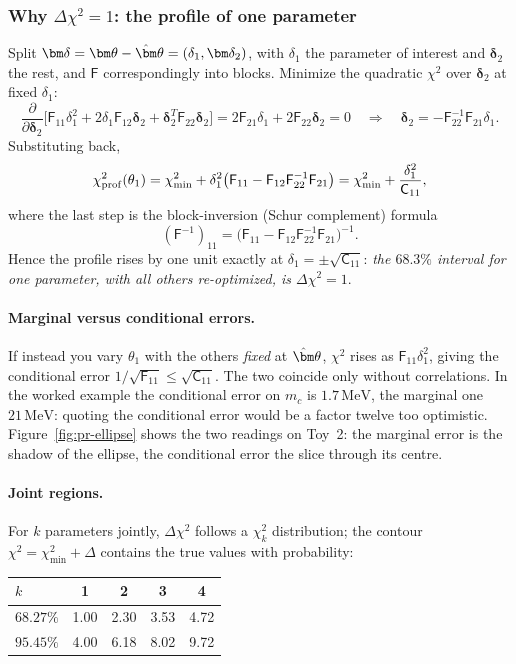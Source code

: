 \documentclass[11pt,a4paper]{article}
\numberwithin{equation}{section}
\theoremstyle{definition}
\theoremstyle{plain}
\theoremstyle{remark}
\numberwithin{algorithm}{section}
\newcommand{\MeV}{\,\mathrm{MeV}}
\newcommand{\sF}{\mathsf F}
\newcommand{\sC}{\mathsf C}
\newcommand{\vth}{\bm\theta}
\begin{document}
\subsubsection{\texorpdfstring{Why $\Delta\chi^2=1$: the profile of one parameter}{Why Delta chi-squared = 1: the profile of one parameter}}
Split $\bm\delta=\vth-\hat\vth=(\delta_1,\bm\delta_2)$, with $\delta_1$ the parameter of interest and $\bm\delta_2$ the rest, and $\sF$ correspondingly into blocks. Minimize the quadratic $\chi^2$ over $\bm\delta_2$ at fixed $\delta_1$:
\[
\frac{\partial}{\partial\bm\delta_2}\big[\sF_{11}\delta_1^2+2\delta_1\sF_{12}\bm\delta_2+\bm\delta_2^T\sF_{22}\bm\delta_2\big]=2\sF_{21}\delta_1+2\sF_{22}\bm\delta_2=0
\quad\Rightarrow\quad \bm\delta_2=-\sF_{22}^{-1}\sF_{21}\delta_1 .
\]
Substituting back,
\begin{equation}
\chi^2_{\rm prof}(\theta_1)=\chi^2_{\min}+\delta_1^2\big(\sF_{11}-\sF_{12}\sF_{22}^{-1}\sF_{21}\big)
=\chi^2_{\min}+\frac{\delta_1^2}{\sC_{11}},
\end{equation}
where the last step is the block-inversion (Schur complement) formula
\[
(\sF^{-1})_{11}=\big(\sF_{11}-\sF_{12}\sF_{22}^{-1}\sF_{21}\big)^{-1}.
\]
Hence the profile rises by one unit exactly at $\delta_1=\pm\sqrt{\sC_{11}}$: \emph{the $68.3\%$ interval for one parameter, with all others re-optimized, is $\Delta\chi^2=1$}.

\paragraph{Marginal versus conditional errors.} If instead you vary $\theta_1$ with the others \emph{fixed} at $\hat\vth$, $\chi^2$ rises as $\sF_{11}\delta_1^2$, giving the conditional error $1/\sqrt{\sF_{11}}\le\sqrt{\sC_{11}}$. The two coincide only without correlations. In the worked example the conditional error on $m_c$ is $1.7\MeV$, the marginal one $21\MeV$: quoting the conditional error would be a factor twelve too optimistic.
Figure~\ref{fig:pr-ellipse} shows the two readings on Toy~2: the marginal error is the shadow of the ellipse, the conditional error the slice through its centre.

\paragraph{Joint regions.} For $k$ parameters jointly, $\Delta\chi^2$ follows a $\chi^2_k$ distribution; the contour $\chi^2=\chi^2_{\min}+\Delta$ contains the true values with probability:
\begin{center}\small
\begin{tabular}{@{}lcccc@{}}\toprule
$k$ & 1 & 2 & 3 & 4\\\midrule
$68.27\%$ & 1.00 & 2.30 & 3.53 & 4.72\\
$95.45\%$ & 4.00 & 6.18 & 8.02 & 9.72\\\bottomrule
\end{tabular}
\end{center}
\end{document}
